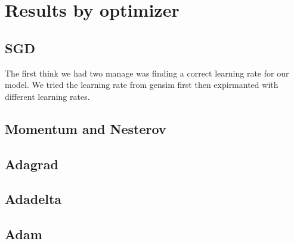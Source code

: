 \section{Results by optimizer}
\subsection{SGD}
The first think we had two manage was finding a correct learning rate for our model. We tried the learning rate from gensim first then expirmanted with different learning rates. 
\subsection{Momentum and Nesterov}
\subsection{Adagrad}
\subsection{Adadelta}
\subsection{Adam}
